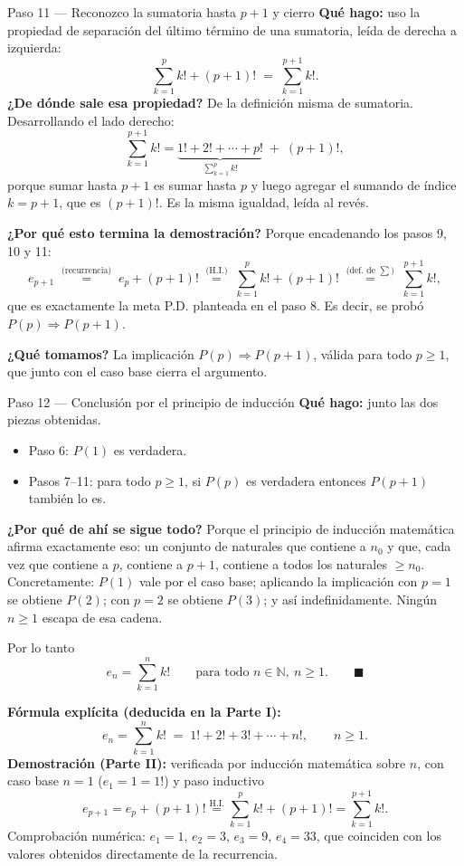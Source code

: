 \documentclass[11pt]{article}
\begin{document}
\begin{paso}{Paso 11 --- Reconozco la sumatoria hasta $p+1$ y cierro}
\textbf{Qué hago:} uso la propiedad de separación del último término de una sumatoria, leída de derecha a izquierda:
\[
\sum_{k=1}^{p}k! + (p+1)! \;=\; \sum_{k=1}^{p+1}k! .
\]
\textbf{¿De dónde sale esa propiedad?} De la definición misma de sumatoria. Desarrollando el lado derecho:
\[
\sum_{k=1}^{p+1}k! = \underbrace{1!+2!+\cdots+p!}_{\textstyle \sum_{k=1}^{p}k!} \;+\; (p+1)! ,
\]
porque sumar hasta $p+1$ es sumar hasta $p$ y luego agregar el sumando de índice $k=p+1$, que es $(p+1)!$. Es la misma igualdad, leída al revés.

\textbf{¿Por qué esto termina la demostración?} Porque encadenando los pasos 9, 10 y 11:
\[
e_{p+1} \;\overset{\text{(recurrencia)}}{=}\; e_p+(p+1)! \;\overset{\text{(H.I.)}}{=}\; \sum_{k=1}^{p}k!+(p+1)! \;\overset{\text{(def. de }\sum)}{=}\; \sum_{k=1}^{p+1}k! ,
\]
que es exactamente la meta P.D. planteada en el paso 8. Es decir, se probó $P(p)\Rightarrow P(p+1)$.

\textbf{¿Qué tomamos?} La implicación $P(p)\Rightarrow P(p+1)$, válida para todo $p\ge 1$, que junto con el caso base cierra el argumento.
\end{paso}

\begin{paso}{Paso 12 --- Conclusión por el principio de inducción}
\textbf{Qué hago:} junto las dos piezas obtenidas.
\begin{itemize}[leftmargin=*]
  \item Paso 6: $P(1)$ es verdadera.
  \item Pasos 7--11: para todo $p\ge1$, si $P(p)$ es verdadera entonces $P(p+1)$ también lo es.
\end{itemize}
\textbf{¿Por qué de ahí se sigue todo?} Porque el principio de inducción matemática afirma exactamente eso: un conjunto de naturales que contiene a $n_0$ y que, cada vez que contiene a $p$, contiene a $p+1$, contiene a todos los naturales $\ge n_0$. Concretamente: $P(1)$ vale por el caso base; aplicando la implicación con $p=1$ se obtiene $P(2)$; con $p=2$ se obtiene $P(3)$; y así indefinidamente. Ningún $n\ge1$ escapa de esa cadena.

Por lo tanto
\[
e_n=\sum_{k=1}^{n}k!\qquad\text{para todo } n\in\mathbb{N},\ n\ge 1. \qquad\blacksquare
\]
\end{paso}

\begin{resp}
\textbf{Fórmula explícita (deducida en la Parte I):}
\[
e_n=\sum_{k=1}^{n}k! \;=\; 1!+2!+3!+\cdots+n! ,\qquad n\ge 1 .
\]
\textbf{Demostración (Parte II):} verificada por inducción matemática sobre $n$, con caso base $n=1$ ($e_1=1=1!$) y paso inductivo
\[
e_{p+1}=e_p+(p+1)!\overset{\text{H.I.}}{=}\sum_{k=1}^{p}k!+(p+1)!=\sum_{k=1}^{p+1}k! .
\]
Comprobación numérica: $e_1=1$, $e_2=3$, $e_3=9$, $e_4=33$, que coinciden con los valores obtenidos directamente de la recurrencia.
\end{resp}
\end{document}
